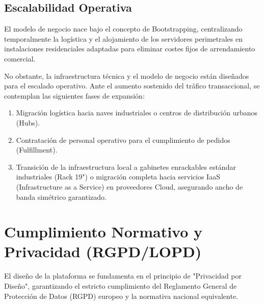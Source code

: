 \documentclass[12pt,a4paper]{article}
\begin{document}
\subsection{Escalabilidad Operativa}
El modelo de negocio nace bajo el concepto de Bootstrapping, centralizando temporalmente la logística y el alojamiento de los servidores perimetrales en instalaciones residenciales adaptadas para eliminar costes fijos de arrendamiento comercial.

No obstante, la infraestructura técnica y el modelo de negocio están diseñados para el escalado operativo. Ante el aumento sostenido del tráfico transaccional, se contemplan las siguientes fases de expansión:
\begin{enumerate}
    \item Migración logística hacia naves industriales o centros de distribución urbanos (Hubs).
    \item Contratación de personal operativo para el cumplimiento de pedidos (Fulfillment).
    \item Transición de la infraestructura local a gabinetes enrackables estándar industriales (Rack 19") o migración completa hacia servicios IaaS (Infrastructure as a Service) en proveedores Cloud, asegurando ancho de banda simétrico garantizado.
\end{enumerate}

\section{Cumplimiento Normativo y Privacidad (RGPD/LOPD)}
\label{LOPD}

El diseño de la plataforma se fundamenta en el principio de "Privacidad por Diseño", garantizando el estricto cumplimiento del Reglamento General de Protección de Datos (RGPD) europeo y la normativa nacional equivalente.
\end{document}
